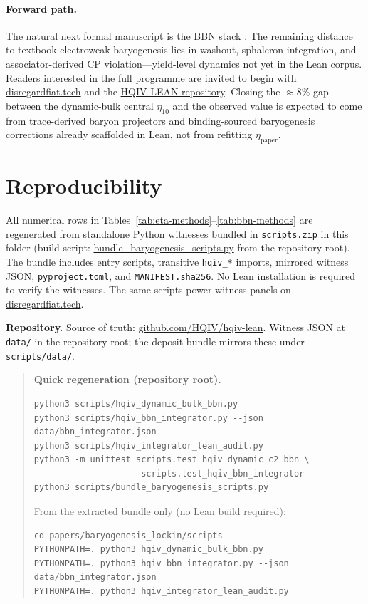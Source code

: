\documentclass[11pt]{amsart}
\newcommand{\leanrepourl}{https://github.com/HQIV/hqiv-lean}
\newcommand{\programmeurl}{https://disregardfiat.tech}
\newcommand{\scriptrepo}{https://github.com/HQIV/hqiv-lean/blob/main/scripts}
\newenvironment{summarybox}{%
  \medskip\begin{quote}\small
}{%
  \end{quote}\medskip
}
\begin{document}
\paragraph{Forward path.}
The natural next formal manuscript is the BBN stack
\cite{hqiv-bbn-paper}. The remaining distance to textbook electroweak
baryogenesis lies in washout, sphaleron integration, and
associator-derived CP violation---yield-level dynamics not yet in the
Lean corpus. Readers interested in the full programme are invited to
begin with \href{\programmeurl}{disregardfiat.tech} and the
\href{\leanrepourl}{HQIV-LEAN repository}. Closing the $\approx 8\%$ gap between the
dynamic-bulk central $\eta_{10}$ and the observed value is expected to
come from trace-derived baryon projectors and binding-sourced baryogenesis
corrections already scaffolded in Lean, not from refitting
$\eta_{\mathrm{paper}}$.

\section*{Reproducibility}
\label{sec:repro}

All numerical rows in Tables~\ref{tab:eta-methods}--\ref{tab:bbn-methods} are
regenerated from standalone Python witnesses bundled in
\texttt{scripts.zip} in this folder (build script:
\href{\scriptrepo/bundle\_baryogenesis\_scripts.py}{bundle\_baryogenesis\_scripts.py}
from the repository root). The bundle includes entry scripts, transitive
\texttt{hqiv\_*} imports, mirrored witness JSON, \texttt{pyproject.toml}, and
\texttt{MANIFEST.sha256}. No Lean installation is required to verify the
witnesses. The same scripts power witness panels on
\href{\programmeurl}{disregardfiat.tech}.

\noindent\textbf{Repository.}
Source of truth: \href{\leanrepourl}{github.com/HQIV/hqiv-lean}. Witness JSON
at \texttt{data/} in the repository root; the deposit bundle mirrors these
under \texttt{scripts/data/}.

\begin{summarybox}
\noindent\textbf{Quick regeneration (repository root).}
\begin{verbatim}
python3 scripts/hqiv_dynamic_bulk_bbn.py
python3 scripts/hqiv_bbn_integrator.py --json data/bbn_integrator.json
python3 scripts/hqiv_integrator_lean_audit.py
python3 -m unittest scripts.test_hqiv_dynamic_c2_bbn \
                     scripts.test_hqiv_bbn_integrator
python3 scripts/bundle_baryogenesis_scripts.py
\end{verbatim}
From the extracted bundle only (no Lean build required):
\begin{verbatim}
cd papers/baryogenesis_lockin/scripts
PYTHONPATH=. python3 hqiv_dynamic_bulk_bbn.py
PYTHONPATH=. python3 hqiv_bbn_integrator.py --json data/bbn_integrator.json
PYTHONPATH=. python3 hqiv_integrator_lean_audit.py
\end{verbatim}
\end{summarybox}
\end{document}
